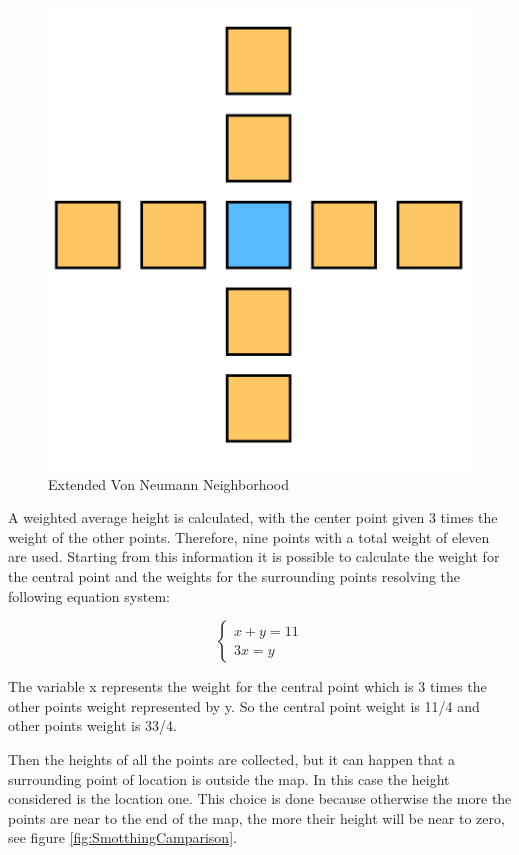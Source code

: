 \documentclass[12pt]{article}
\begin{document}
    \begin{figure}
        \centering
        \includegraphics[scale = 0.7]{images/Extended VonNeumannNeighborhood.png}
        \caption{Extended Von Neumann Neighborhood}
        \label{fig:vonNeumann}
    \end{figure}

    \noindent
    A weighted average height is calculated, with the center point given 3 times the weight of the other points. Therefore, nine points with a total weight of eleven are used.
    Starting from this information it is possible to calculate the weight for the central point and the weights for the surrounding points resolving the following equation system:

    \begin{equation}
        \begin{cases}
            x + y = 11
            \\ 3x = y
        \end{cases}
    \end{equation}

    \noindent
    The variable x represents the weight for the central point which is 3 times the other points weight represented by y. So the central point weight is 11/4 and other points weight is 33/4.

    Then the heights of all the points are collected, but it can happen that a surrounding point of location is outside the map. In this case the height considered  is the location one. 
    This choice is done because otherwise the more the points are near to the end of the map, the more their height will be near to zero, see figure \ref{fig:SmotthingCamparison}.
    
\end{document}
